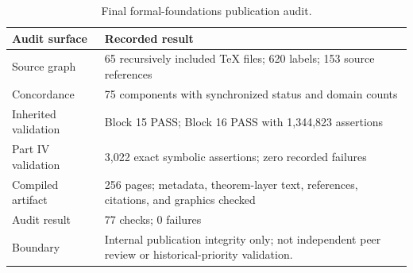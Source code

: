 \begin{table}[htbp]
\centering
\small
\caption{Final formal-foundations publication audit.}
\label{tab:formal-foundations-v2-audit}
\begin{tabularx}{\textwidth}{@{}L{0.31\textwidth}Y@{}}
\toprule
Audit surface & Recorded result\\
\midrule
Source graph & 65 recursively included TeX files; 620 labels; 153 source references\\
Concordance & 75 components with synchronized status and domain counts\\
Inherited validation & Block 15 PASS; Block 16 PASS with 1,344,823 assertions\\
Part IV validation & 3,022 exact symbolic assertions; zero recorded failures\\
Compiled artifact & 256 pages; metadata, theorem-layer text, references, citations, and graphics checked\\
Audit result & 77 checks; 0 failures\\
Boundary & Internal publication integrity only; not independent peer review or historical-priority validation.\\
\bottomrule
\end{tabularx}
\end{table}
